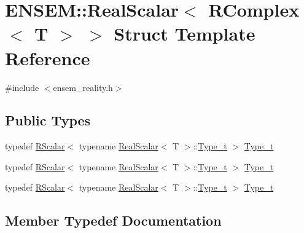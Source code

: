 \hypertarget{structENSEM_1_1RealScalar_3_01RComplex_3_01T_01_4_01_4}{}\section{E\+N\+S\+EM\+:\+:Real\+Scalar$<$ R\+Complex$<$ T $>$ $>$ Struct Template Reference}
\label{structENSEM_1_1RealScalar_3_01RComplex_3_01T_01_4_01_4}


{\ttfamily \#include $<$ensem\+\_\+reality.\+h$>$}

\subsection*{Public Types}
\begin{DoxyCompactItemize}
\item 
typedef \mbox{\hyperlink{classENSEM_1_1RScalar}{R\+Scalar}}$<$ typename \mbox{\hyperlink{structENSEM_1_1RealScalar}{Real\+Scalar}}$<$ T $>$\+::\mbox{\hyperlink{structENSEM_1_1RealScalar_3_01RComplex_3_01T_01_4_01_4_a8e52d83700f12173749eb640b815684c}{Type\+\_\+t}} $>$ \mbox{\hyperlink{structENSEM_1_1RealScalar_3_01RComplex_3_01T_01_4_01_4_a8e52d83700f12173749eb640b815684c}{Type\+\_\+t}}
\item 
typedef \mbox{\hyperlink{classENSEM_1_1RScalar}{R\+Scalar}}$<$ typename \mbox{\hyperlink{structENSEM_1_1RealScalar}{Real\+Scalar}}$<$ T $>$\+::\mbox{\hyperlink{structENSEM_1_1RealScalar_3_01RComplex_3_01T_01_4_01_4_a8e52d83700f12173749eb640b815684c}{Type\+\_\+t}} $>$ \mbox{\hyperlink{structENSEM_1_1RealScalar_3_01RComplex_3_01T_01_4_01_4_a8e52d83700f12173749eb640b815684c}{Type\+\_\+t}}
\item 
typedef \mbox{\hyperlink{classENSEM_1_1RScalar}{R\+Scalar}}$<$ typename \mbox{\hyperlink{structENSEM_1_1RealScalar}{Real\+Scalar}}$<$ T $>$\+::\mbox{\hyperlink{structENSEM_1_1RealScalar_3_01RComplex_3_01T_01_4_01_4_a8e52d83700f12173749eb640b815684c}{Type\+\_\+t}} $>$ \mbox{\hyperlink{structENSEM_1_1RealScalar_3_01RComplex_3_01T_01_4_01_4_a8e52d83700f12173749eb640b815684c}{Type\+\_\+t}}
\end{DoxyCompactItemize}


\subsection{Member Typedef Documentation}
\mbox{\label{structENSEM_1_1RealScalar_3_01RComplex_3_01T_01_4_01_4_a8e52d83700f12173749eb640b815684c}} 
